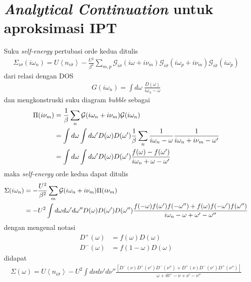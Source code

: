 
\chapter{\textit{Analytical Continuation} untuk aproksimasi IPT}

Suku \textit{self-energy} pertubasi orde kedua ditulis
\begin{align}
\Sigma_{i\sigma}(i\omega_n) = U\left< n_{i\bar{\sigma}} \right> - \frac{U^2}{\beta^2} \sum_{m,p} \mathcal{G}_{i\sigma}(i\omega + i\nu_m)\mathcal{G}_{i\bar{\sigma}}(i\omega_p + i\nu_m)\mathcal{G}_{i\bar{\sigma}}(i\omega_p)
\end{align}
dari relasi dengan DOS
\begin{align}
G(i\omega_n) = \int d\omega \; \frac{D(\omega)}{i\omega_n - \omega}
\end{align}
dan mengkonstruski suku diagram \textit{bubble} sebagai
\begin{align}
\Pi(i\nu_m) &= \frac{1}{\beta} \sum_n \mathcal{G}(i\omega_n + i\nu_m)\mathcal{G}(i\omega_n)\notag\\
&= \int d\omega \int d\omega' D(\omega)D(\omega') \frac{1}{\beta} \sum_n \frac{1}{i\omega_n - \omega}\frac{1}{i\omega_n + i\nu_m - \omega'}\notag\\
&= \int d\omega \int d\omega' D(\omega)D(\omega')\frac{f(\omega) - f(\omega')}{i\omega_n + \omega - \omega'}
\end{align}
maka \textit{self-energy} orde kedua dapat ditulis
\begin{align}
\Sigma(i\omega_n) &= -\frac{U^2}{\beta^2}\sum_m \mathcal{G}(i\omega_n + i\nu_m)\Pi(i\nu_m)\notag\\
&= -U^2 \int d\omega d\omega' d\omega'' D(\omega)D(\omega')D(\omega'') \frac{f(-\omega)f(\omega')f(-\omega'') + f(\omega)f(-\omega')f(\omega'')}{i\omega_n - \omega + \omega' - \omega''} \notag
\end{align}
dengan mengenal notasi
\begin{align}
D^+(\omega) &= f(\omega)D(\omega)\\
D^-(\omega) &= f(1 - \omega)D(\omega)
\end{align}
didapat
\begin{align}
\Sigma(\omega) = U\left< n_{i\bar{\sigma}} \right> - U^2 \int d\nu d\nu' d\nu'' \frac{[D^-(\nu)D^+(\nu')D^-(\nu'') + D^+(\nu)D^-(\nu')D^+(\nu'')]}{\omega + i0^+ - \nu + \nu' - \nu''}
\end{align}